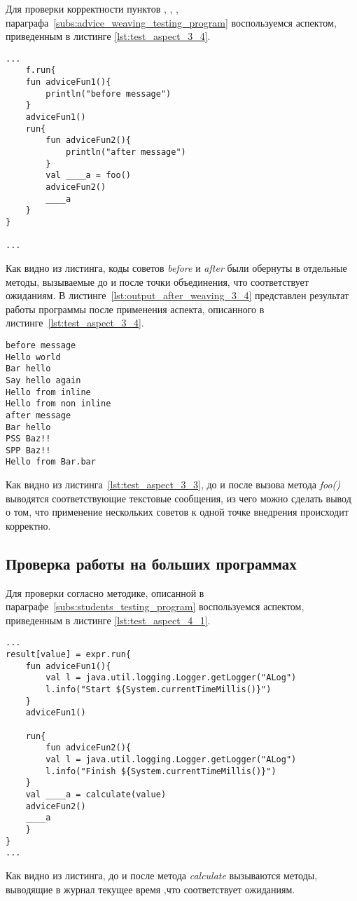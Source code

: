 Для проверки корректности пунктов \quotes{\ref{list:before_advice_weaving_check}},
\quotes{\ref{list:after_advice_weaving_check}},
\quotes{\ref{list:several_advices_weaving_check}},
\quotes{\ref{list:program_work_check}} параграфа~\ref{subs:advice_weaving_testing_program} воспользуемся аспектом, приведенным в листинге \ref{lst:test_aspect_3_4}.
\begin{lstlisting}[style={java}, label={lst:result_of_weaving_3_4},
 caption={Результат применения аспекта, описанного в листинге~\ref{lst:test_aspect_3_4}, к тестовой программе}]
...
    f.run{
    fun adviceFun1(){
        println("before message")
    }
	adviceFun1()
	run{
		fun adviceFun2(){
	        println("after message")
    	}
		val ____a = foo()
		adviceFun2()
		____a
	}
}

...
\end{lstlisting}
Как видно из листинга, коды советов \textit{before} и \textit{after} были обернуты в отдельные методы, вызываемые до и после точки объединения, что соответствует ожиданиям.
В листинге~\ref{lst:output_after_weaving_3_4} представлен результат работы программы после применения аспекта, описанного в листинге~\ref{lst:test_aspect_3_4}. 
\begin{lstlisting}[style={java}, label={lst:output_after_weaving_3_4},
 caption={Результат работы программы после применения аспекта, описанного в листинге~\ref{lst:test_aspect_3_4}}]
before message
Hello world
Bar hello
Say hello again
Hello from inline
Hello from non inline
after message
Bar hello
PSS Baz!!
SPP Baz!!
Hello from Bar.bar
\end{lstlisting}
Как видно из листинга~\ref{lst:test_aspect_3_3}, до и после вызова метода \textit{foo()} выводятся соответствующие текстовые сообщения, из чего можно сделать вывод о том, что применение нескольких советов к одной точке внедрения происходит корректно.
\subsection{Проверка работы на больших программах}
\label{sub:students_weaving_tests}
Для проверки согласно методике, описанной в параграфе~\ref{subs:students_testing_program} воспользуемся аспектом, приведенным в листинге \ref{lst:test_aspect_4_1}.
\begin{lstlisting}[style={java}, label={lst:result_of_weaving_4_1},
 caption={Результат применения аспекта, описанного в листинге~\ref{lst:test_aspect_4_1}, к тестовой программе}]
...
result[value] = expr.run{
	fun adviceFun1(){
    	val l = java.util.logging.Logger.getLogger("ALog")
    	l.info("Start ${System.currentTimeMillis()}")
  	}
	adviceFun1()
	
	run{
		fun adviceFun2(){
    	val l = java.util.logging.Logger.getLogger("ALog")
    	l.info("Finish ${System.currentTimeMillis()}")
  	}
	val ____a = calculate(value)
	adviceFun2()
	____a
	}
}
...
\end{lstlisting}
Как видно из листинга, до и после метода \textit{calculate} вызываются методы, выводящие в журнал текущее время ,что соответствует ожиданиям.

